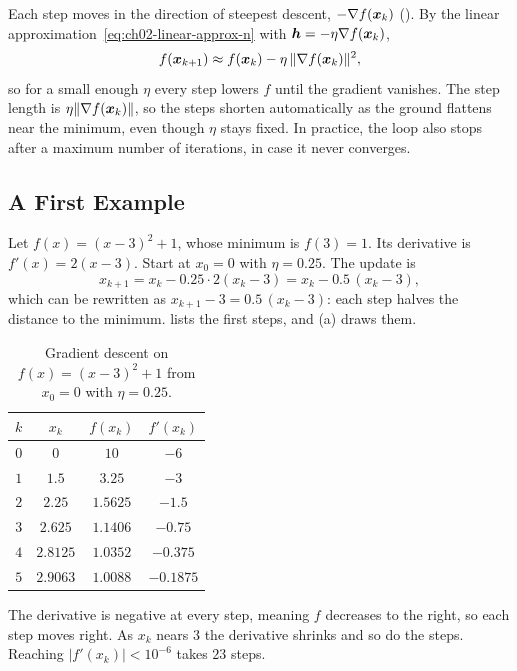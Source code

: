 Each step moves in the direction of steepest descent,
$-\nabla f(\bm{x}_k)$ (). By the linear
approximation~\eqref{eq:ch02-linear-approx-n} with
$\bm{h} = -\eta \nabla f(\bm{x}_k)$,
\[
  f(\bm{x}_{k+1}) \approx f(\bm{x}_k) - \eta \, \|\nabla f(\bm{x}_k)\|^2 ,
\]
so for a small enough $\eta$ every step lowers $f$ until the gradient
vanishes. The step length is $\eta \|\nabla f(\bm{x}_k)\|$, so the steps
shorten automatically as the ground flattens near the minimum, even though
$\eta$ stays fixed. In practice, the loop also stops after a maximum number
of iterations, in case it never converges.

\subsection{A First Example}
\label{sec:ch02-gd-example}

Let $f(x) = (x - 3)^2 + 1$, whose minimum is $f(3) = 1$. Its derivative is
$f'(x) = 2(x - 3)$. Start at $x_0 = 0$ with $\eta = 0.25$. The update is
\[
  x_{k+1} = x_k - 0.25 \cdot 2(x_k - 3) = x_k - 0.5\,(x_k - 3),
\]
which can be rewritten as $x_{k+1} - 3 = 0.5\,(x_k - 3)$: each step halves
the distance to the minimum.  lists the first
steps, and (a) draws them.

\begin{table}[ht]
  \centering
  \caption{Gradient descent on $f(x) = (x - 3)^2 + 1$ from $x_0 = 0$ with
    $\eta = 0.25$.}
  \label{tab:ch02-gd-steps}
  \begin{tabular}{@{}cccc@{}}
    \toprule
    $k$ & $x_k$ & $f(x_k)$ & $f'(x_k)$ \\
    \midrule
    $0$ & $0$ & $10$ & $-6$ \\
    $1$ & $1.5$ & $3.25$ & $-3$ \\
    $2$ & $2.25$ & $1.5625$ & $-1.5$ \\
    $3$ & $2.625$ & $1.1406$ & $-0.75$ \\
    $4$ & $2.8125$ & $1.0352$ & $-0.375$ \\
    $5$ & $2.9063$ & $1.0088$ & $-0.1875$ \\
    \bottomrule
  \end{tabular}
\end{table}

The derivative is negative at every step, meaning $f$ decreases to the
right, so each step moves right. As $x_k$ nears $3$ the derivative
shrinks and so do the steps. Reaching $|f'(x_k)| < 10^{-6}$ takes $23$
steps.

